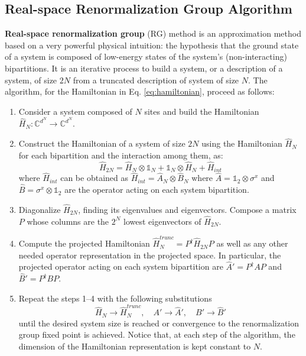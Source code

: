 \documentclass[rmp,10pt,onecolumn,fleqn,notitlepage]{revtex4-1}
\begin{document}
\subsection{Real-space Renormalization Group Algorithm}

\textbf{Real-space renormalization group} (RG) method is an approximation method based on a very powerful physical intuition: the hypothesis that the ground state of a system is composed of low-energy states of the system’s (non-interacting) bipartitions.
It is an iterative process to build a system, or a description of a system, of size $2N$ from a truncated description of system of size $N$. The algorithm, for the Hamiltonian in Eq. \eqref{eq:hamiltonian}, proceed as follows:

\begin{enumerate}

\item Consider a system composed of $N$ sites and build the Hamiltonian \( \hat{H}_N: \mathbb{C}^{d^N} \rightarrow \mathbb{C}^{d^N} \).

\item Construct the Hamiltonian of a system of size \( 2N \) using the Hamiltonian \( \hat{H}_N  \) for each bipartition and the interaction among them, as:
\begin{equation}
   \hat{H} _{2N} = \hat{H}_N \otimes \mathbb{1}_N + \mathbb{1}_N \otimes \hat{H}_N + \hat{H}_{int}
   \label{eq:H2N}
\end{equation}
where \( \hat{H}_{int}  \) can be obtained as \( \hat{H}_{int} =  \hat{A}_N \otimes \hat{B}_N    \) where \( \hat{A} = \mathbb{1}_2 \otimes \sigma ^x \) and \( \hat{B} = \sigma ^x \otimes \mathbb{1}_2  \) are the operator acting on each system bipartition.

\item Diagonalize \( \hat{H}_{2N}  \), finding its eigenvalues and eigenvectors.
Compose a matrix $P$ whose columns are the $2^N$ lowest eigenvectors of \( \hat{H}_{2N}  \).

\item Compute the projected Hamiltonian \( \hat{H}_N^{trunc} = P^\dag \hat{H}_{2N} P  \) as well as any other needed operator representation in the projected space. In particular, the projected operator acting on each system bipartition are \( \hat{A}' = P ^\dag A P  \) and \( \hat{B}' = P ^\dag B P  \).

\item Repeat the steps 1–4 with the following substitutions
\begin{equation*}
  \hat{H}_N \rightarrow  \hat{H}_{N}^{trunc}, \quad A' \rightarrow \hat{A}', \quad B' \rightarrow \hat{B}'
\end{equation*}
until the desired system size is reached or convergence to the renormalization group fixed point is achieved. Notice that, at each step of the algorithm, the dimension of the Hamiltonian representation is kept constant to $N$.

\end{enumerate}
\end{document}
